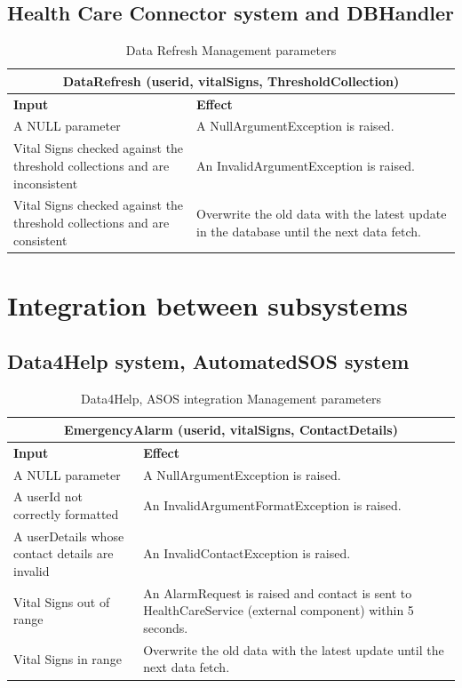 \documentclass[a4paper, hidelinks, 12pt]{report}
\begin{document}
	\subsection{Health Care Connector system and DBHandler }
	\begin{table}[H]
		\centering
		\begin{tabular}{|p{6cm}|p{9cm}|}
			\hline\hline
			\multicolumn{2}{c}{\textbf{DataRefresh (userid, vitalSigns, ThresholdCollection)} }\\
			\hline
			\textbf{Input} & \textbf{Effect} \\ [0.5ex]
			\hline
			A NULL parameter & A NullArgumentException is raised.  \\
			\hline
			Vital Signs checked against the threshold collections  and are inconsistent & An InvalidArgumentException is raised.\\
			\hline
			Vital Signs checked against the threshold collections  and are consistent & Overwrite the old data with the latest update in the database until the next data fetch.\\
\hline
		\end{tabular}
		\caption{Data Refresh Management parameters}
		\label{fig:Data Refresh Management parameters}
	\end{table}
	
	\section{Integration between subsystems}
	\subsection{Data4Help system, AutomatedSOS system}
		\begin{table}[H]
		\centering
		\begin{tabular}{|p{6cm}|p{9cm}|}
			\hline\hline
			\multicolumn{2}{c}{\textbf{EmergencyAlarm (userid, vitalSigns, ContactDetails)} }\\
			\hline
			\textbf{Input} & \textbf{Effect} \\ [0.5ex]
			\hline
			A NULL parameter & A NullArgumentException is raised.  \\
			\hline
			A userId not correctly formatted & An InvalidArgumentFormatException is raised.\\
\hline
A userDetails whose contact details are invalid & An InvalidContactException is raised.\\
\hline
			Vital Signs out of range & An AlarmRequest is raised and contact is sent to HealthCareService (external component) within 5 seconds.\\
			\hline
			Vital Signs in range & Overwrite the old data with the latest update until the next data fetch.\\
\hline
		\end{tabular}
		\caption{Data4Help, ASOS integration Management parameters}
		\label{fig:Data4Help, ASOS integration Management parameters}
	\end{table}
	
\end{document}
